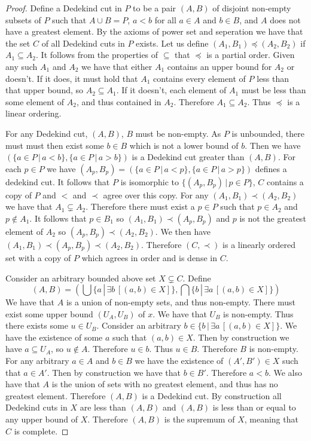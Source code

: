 \documentclass{article}
\theoremstyle{definition}
\begin{document}
\begin{proof}
    Define a Dedekind cut in $P$ to be a pair $(A, B)$ of disjoint non-empty subsets of $P$ such that $A \cup B = P$, $a < b$ for all $a \in A$ and $b \in B$, and $A$ does not have a greatest element. By the axioms of power set and seperation we have that the set $C$ of all Dedekind cuts in $P$ exists. Let us define $(A_1, B_1) \preceq (A_2, B_2)$ if $A_1 \subseteq A_2$. It follows from the properties of $\subseteq$ that $\preceq$ is a partial order. Given any such $A_1$ and $A_2$ we have that either $A_1$ contains an upper bound for $A_2$ or doesn't. If it does, it must hold that $A_1$ contains every element of $P$ less than  that upper bound, so $A_2 \subseteq A_1$. If it doesn't, each element of $A_1$ must be less than some element of $A_2$, and thus contained in $A_2$. Therefore $A_1 \subseteq A_2$. Thus $\preceq$ is a linear ordering. 
    
    For any Dedekind cut, $(A, B)$, $B$ must be non-empty. As $P$ is unbounded, there must must then exist some $b \in B$ which is not a lower bound of $b$. Then we have $(\{a \in P \, | \, a < b\}, \{a \in P \, | \, a > b\})$ is a Dedekind cut greater than $(A, B)$. For each $p \in P$ we have $(A_p, B_p) = (\{a \in P \, | \, a < p\}, \{a \in P \, | \, a > p\})$ defines a dedekind cut. It follows that $P$ is isomorphic to $\{(A_p, B_p) \, | \, p \in P \}$, $C$ contains a copy of $P$ and $<$ and $\prec$ agree over this copy. For any $(A_1, B_1) \prec (A_2, B_2)$ we have that $A_1 \subsetneq A_2$. Therefore there must exist a $p \in P$ such that $p \in A_2$ and $p \not\in A_1$. It follows that $p \in B_1$ so $(A_1, B_1) \prec (A_p, B_p)$ and $p$ is not the greatest element of $A_2$ so $(A_p, B_p) \prec (A_2, B_2)$. We then have $(A_1, B_1) \prec (A_p, B_p) \prec (A_2, B_2)$. Therefore $(C, \prec)$ is a linearly ordered set with a copy of $P$ which agrees in order and is dense in $C$. 

    Consider an arbitrary bounded above set $X \subsetneq C$. Define 
    \[
        (A, B) = (\bigcup \{a \, | \, \exists b \, [(a, b) \in X]\}, \bigcap \{b \, | \, \exists a \, [(a, b) \in X]\})
    \]
    We have that $A$ is a union of non-empty sets, and thus non-empty. There must exist some upper bound $(U_A, U_B)$ of $x$. We have that $U_B$ is non-empty. Thus there exists some $u \in U_B$. Consider an arbitrary $b \in \{b \, | \, \exists a \, [(a, b) \in X]\}$. We have the existence of some $a$ such that $(a, b) \in X$. Then by construction we have $a \subseteq U_A$, so $u \not\in A$. Therefore $u \in b$. Thus $u \in B$. Therefore $B$ is non-empty. For any arbitrary $a \in A$ and $b \in B$ we have the existence of $(A', B') \in X$ such that $a \in A'$. Then by construction we have that $b \in B'$. Therefore $a < b$. We also have that $A$ is the union of sets with no greatest element, and thus has no greatest element. Therefore $(A, B)$ is a Dedekind cut. By construction all Dedekind cuts in $X$ are less than $(A, B)$ and $(A, B)$ is less than or equal to any upper bound of $X$. Therefore $(A, B)$ is the supremum of $X$, meaning that $C$ is complete.
\end{proof}
\end{document}
